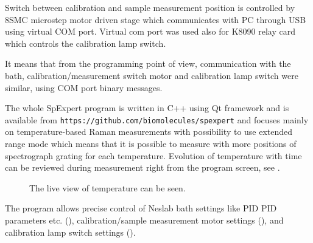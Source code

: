 Switch between calibration and sample measurement position is controlled by
8SMC microstep motor driven stage which communicates with PC through USB
using virtual COM port.
Virtual com port was used also for K8090 relay card which controls the
calibration lamp switch.

It means that from the programming point of view, communication with the
bath, calibration/measurement switch motor and calibration lamp switch were
similar, using COM port binary messages.

The whole SpExpert program is written in C++ using Qt framework and is
available from
\texttt{https://github.com/biomolecules/spexpert} and focuses mainly on
temperature-based Raman measurements with possibility to use extended range
mode which means that it is possible to measure with more positions of
spectrograph grating for each temperature.
Evolution of temperature with time can be reviewed during measurement right
from the program screen, see
.

\begin{figure}
	\centering
	\caption[%
			SpExpert program during temperature dependent mesurement.
	]{%
		The live view of temperature can be seen.}
	\label{\figlabel{spex_automation:temperature_measurement}}
\end{figure}

The program allows precise control of Neslab bath settings like PID
PID parameters etc.
(),
calibration/sample measurement motor settings
(),
and calibration lamp switch settings
().

\begin{figure}
	\centering
	\caption[%
			Settings of Neslab bath available from SpExpert program.
	]{%
		}
	\label{\figlabel{spex_automation:neslabus}}
\end{figure}

\begin{figure}
	\centering
	\caption[%
			Settings of calibration/sample measurement motor available from SpExpert
			program.
	]{%
		}
	\label{\figlabel{spex_automation:stage_control}}
\end{figure}

